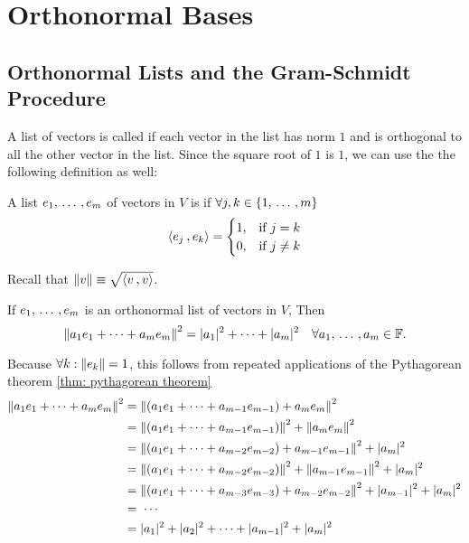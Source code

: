 \section{Orthonormal Bases}

\subsection{Orthonormal Lists and the Gram-Schmidt Procedure}
\begin{mydef}[orthonormal]
  A list of vectors is called  if each vector in the list has norm $1$ and is orthogonal to all the other vector in the list. Since the square root of $1$ is $1$, we can use the the following definition as well:

  A list $e_1, {\, \ldots \,\,}, e_m$ of vectors in $V$ is  if $\forall j,k \in \{1, {\, \ldots \,\,}, m\}$
  \begin{equation}
    \ip{e_j}{e_k} = \begin{cases}
      1,  & \text{if $j=k$} \\
      0, & \text{if $j \neq k$}
    \end{cases}
  \end{equation}

  Recall that $\norm{v} \equiv \sqrt{\ip{v}{v}}$.
\end{mydef}

\begin{thm}
  \label{thm: norm of an orthonormal linear combination}
  If $e_1, {\, \ldots \,\,}, e_m$ is an orthonormal list of vectors in $V$, Then
  \begin{equation}
    \left \lVert a_1e_1 + \cdots+ a_m e_m \right \rVert ^2 = |a_1|^2 + \cdots + |a_m|^2 \quad \forall a_1, {\, \ldots \,\,}, a_m \in \mathbb{F}.
  \end{equation}
\end{thm}
\begin{prf}
  Because $\forall k: \left \lVert e_k \right \rVert=1$, this follows from repeated applications of the Pythagorean theorem \ref{thm: pythagorean theorem}
  \begin{equation}
    \begin{aligned}
      \left \lVert a_1e_1 + \cdots+ a_m e_m \right \rVert ^2
      & = \left \lVert (a_1e_1 + \cdots + a_{m-1}e_{m-1}) + a_m e_m \right \rVert ^2 \\
      & = \left \lVert (a_1e_1 + \cdots + a_{m-1}e_{m-1}) \right \rVert^2 + \left \lVert a_m e_m \right \rVert ^2 \\
      & = \left \lVert (a_1e_1 + \cdots + a_{m-2}e_{m-2}) + a_{m-1}e_{m-1} \right \rVert^2 + |a_m|^2 \\
      & = \left \lVert (a_1e_1 + \cdots + a_{m-2}e_{m-2}) \right \rVert^2 + \left \lVert a_{m-1}e_{m-1} \right \rVert^2 + |a_m|^2\\
      & = \left \lVert (a_1e_1 + \cdots + a_{m-3}e_{m-3}) + a_{m-2}e_{m-2} \right \rVert^2 + |a_{m-1}|^2 + |a_m|^2\\
      & = \; \cdots \\
      & = |a_1|^2 + |a_2|^2 + \cdots + |a_{m-1}|^2 + |a_m|^2
    \end{aligned}
  \end{equation}
  \vspace{-1em}
\end{prf}

